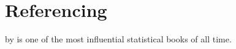 \documentclass{article}
\begin{document}
\section{Referencing}

 by \citeauthor{Huff1954} is one of the most influential statistical books of all time.

\printbibliography
\end{document}
